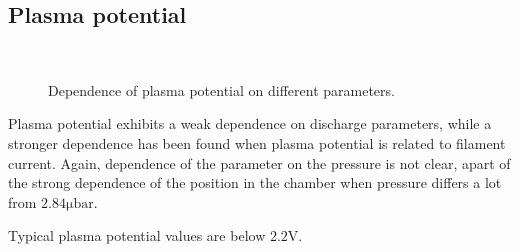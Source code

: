 \documentclass[11pt,a4 paper]{article}
\begin{document}
\subsection{Plasma potential}
\begin{figure}[H]
\\%
 \caption{Dependence of plasma potential on different parameters.}\label{fig:n}%
\end{figure}
Plasma potential exhibits a weak dependence on discharge parameters, while a stronger dependence has been found when plasma potential is related to filament current. Again, dependence of the parameter on the pressure is not clear, apart of the strong dependence of the position in the chamber when pressure differs a lot from $2.84\si{\micro\bar}$.

Typical plasma potential values are below $2.2\si\volt$.
\end{document}
